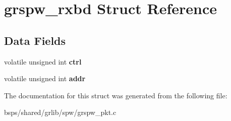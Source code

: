 \hypertarget{structgrspw__rxbd}{}\section{grspw\+\_\+rxbd Struct Reference}
\label{structgrspw__rxbd}
\subsection*{Data Fields}
\begin{DoxyCompactItemize}
\item 
\mbox{\label{structgrspw__rxbd_a0012a2569c0024b91223cdeef606c612}} 
volatile unsigned int {\bfseries ctrl}
\item 
\mbox{\label{structgrspw__rxbd_afe187e4a30cc6475ae39325d5e750029}} 
volatile unsigned int {\bfseries addr}
\end{DoxyCompactItemize}


The documentation for this struct was generated from the following file\+:\begin{DoxyCompactItemize}
\item 
bsps/shared/grlib/spw/grspw\+\_\+pkt.\+c\end{DoxyCompactItemize}
